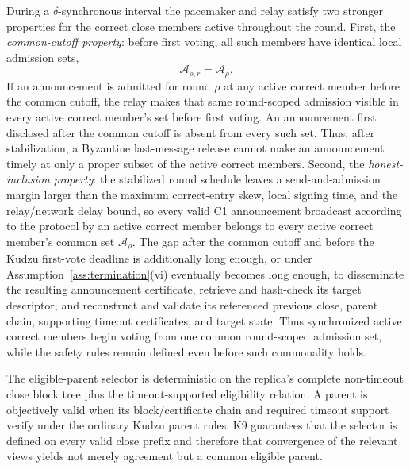 \documentclass[11pt]{article}
\theoremstyle{definition}
\theoremstyle{remark}
\begin{document}
During a $\delta$-synchronous interval the pacemaker and relay satisfy two stronger properties for the correct close members active throughout the round. First, the \emph{common-cutoff property}: before first voting, all such members have identical local admission sets,
\[
  \mathcal A_{\rho,r}=\mathcal A_\rho .
\]
If an announcement is admitted for round $\rho$ at any active correct member before the common cutoff, the relay makes that same round-scoped admission visible in every active correct member's set before first voting. An announcement first disclosed after the common cutoff is absent from every such set. Thus, after stabilization, a Byzantine last-message release cannot make an announcement timely at only a proper subset of the active correct members. Second, the \emph{honest-inclusion property}: the stabilized round schedule leaves a send-and-admission margin larger than the maximum correct-entry skew, local signing time, and the relay/network delay bound, so every valid C1 announcement broadcast according to the protocol by an active correct member belongs to every active correct member's common set $\mathcal A_\rho$. The gap after the common cutoff and before the Kudzu first-vote deadline is additionally long enough, or under Assumption~\ref{ass:termination}(vi) eventually becomes long enough, to disseminate the resulting announcement certificate, retrieve and hash-check its target descriptor, and reconstruct and validate its referenced previous close, parent chain, supporting timeout certificates, and target state. Thus synchronized active correct members begin voting from one common round-scoped admission set, while the safety rules remain defined even before such commonality holds.

The eligible-parent selector is deterministic on the replica's complete non-timeout close block tree plus the timeout-supported eligibility relation. A parent is objectively valid when its block/certificate chain and required timeout support verify under the ordinary Kudzu parent rules. K9 guarantees that the selector is defined on every valid close prefix and therefore that convergence of the relevant views yields not merely agreement but a common eligible parent.
\end{document}
